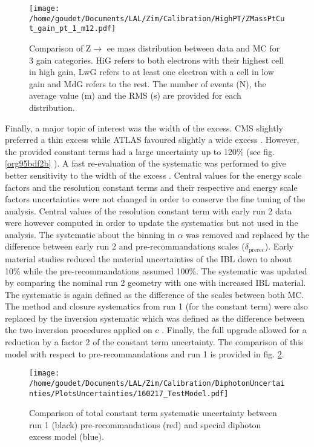 \begin{figure}[htbp]
\centering
\texttt{[image: /home/goudet/Documents/LAL/Zim/Calibration/HighPT/ZMassPtCut\_gain\_pt\_1\_m12.pdf]}
\caption{\label{fig:orgd958247}
Comparison of Z\(\rightarrow\) ee mass distribution between data and MC for 3 gain categories. HiG refers to both electrons with their highest cell in high gain, LwG refers to at least one electron with a cell in low gain and MdG refers to the rest. The number of events (N), the average value (m) and the RMS (s) are provided for each distribution.\cite{ATL-COM-PHYS-2016-184}}
\end{figure}

Finally, a major topic of interest was the width of the excess.
CMS slightly preferred a thin excess \cite{CMS-PAS-EXO-16-018} while ATLAS favoured slightly a wide excess \cite{ATLAS-CONF-2016-018}.
However, the provided constant terms had a large uncertainty up to 120\% (see fig. \ref{org95bdf2b} ).
A fast re-evaluation of the systematic was performed to give better sensitivity to the width of the excess \cite{ATL-COM-PHYS-2016-184}.
Central values for the energy scale factors and the resolution constant terms and their respective and energy scale factors uncertainties were not changed in order to conserve the fine tuning of the analysis.
Central values of the resolution constant term with early run 2 data were however computed in order to update the systematics but not used in the analysis.
The systematic about the binning in \(\alpha\) was removed and replaced by the difference between early run 2 and pre-recommandations scales (\(\delta_{\text{prerec}}\)).
Early material studies reduced the material uncertainties of the IBL down to about 10\% while the pre-recommandations assumed 100\%.
The systematic was updated by comparing the nominal run 2 geometry with one with increased IBL material.
The systematic is again defined as the difference of the scales between both MC.
The method and closure systematics from run 1 (for the constant term) were also replaced by the inversion systematic which was defined as the difference between the two inversion procedures applied on c \cite{Goudet_750Systematics}.
Finally, the full upgrade allowed for a reduction by a factor 2 of the constant term uncertainty.
The comparison of this model with respect to pre-recommandations and run 1 is provided in fig. \ref{fig:org3f93468}.

\begin{figure}[htbp]
\centering
\texttt{[image: /home/goudet/Documents/LAL/Zim/Calibration/DiphotonUncertainties/PlotsUncertainties/160217\_TestModel.pdf]}
\caption{\label{fig:org3f93468}
Comparison of total constant term systematic uncertainty between run 1 (black) pre-recommandations (red) and special diphoton excess model (blue). \cite{ATL-COM-PHYS-2016-184}}
\end{figure}

